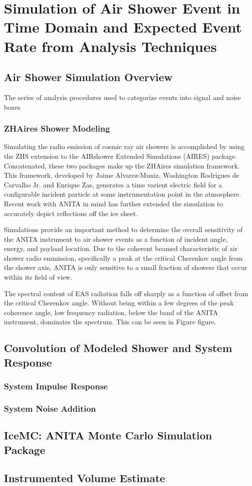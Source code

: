 \chapter{Simulation of Air Shower Event in Time Domain and Expected Event Rate from Analysis Techniques}

\section{Air Shower Simulation Overview}
	The series of analysis procedures used to categorize events into signal and noise boxes
	
	\subsection{ZHAires Shower Modeling}
		Simulating the radio emission of cosmic ray air showers is accomplished by using the ZHS extension to the AIRshower Extended Simulations (AIRES) package.\cite{AlvarezMuñiz2012325}  Concatenated, these two packages make up the ZHAires simulation framework.  This framework, developed by Jaime Alvarez-Muniz, Washington Rodrigues de Carvalho Jr. and Enrique Zas, generates a time varient electric field for a configurable incident particle at some instrumentation point in the atmosphere.  Recent work with ANITA in mind has further extended the simulation to accurately depict reflections off the ice sheet.
		
		Simulations provide an important method to determine the overall sensitivity of the ANITA instrument to air shower events as a function of incident angle, energy, and payload location.  Due to the coherent beamed characteristic of air shower radio emmission, specifically a peak at the critical Cherenkov angle from the shower axis, ANITA is only sensitive to a small fraction of showers that occur within its field of view.
		
		The spectral content of EAS radiation falls off sharply as a function of offset from the critical Cherenkov angle.  Without being within a few degrees of the peak coherence angle, low frequency radiation, below the band of the ANITA instrument, dominates the spectrum.  This can be seen in Figure figure.  
		
\section{Convolution of Modeled Shower and System Response}
		
		\subsection{System Impulse Response}
		
		\subsection{System Noise Addition}
		

\section{IceMC: ANITA Monte Carlo Simulation Package}
	
\section{Instrumented Volume Estimate}